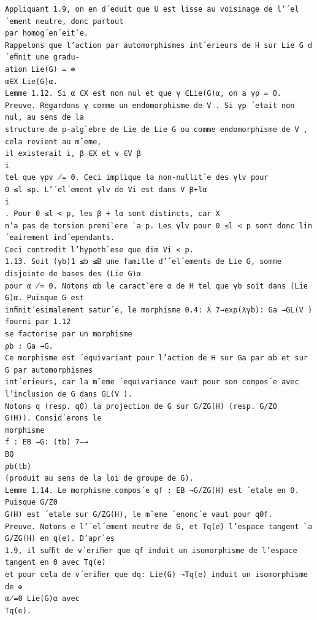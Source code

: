 \documentclass[10pt]{article}
\begin{document}
\begin{verbatim}
Appliquant 1.9, on en d´eduit que U est lisse au voisinage de l’´el´ement neutre, donc partout
par homog´en´eit´e.
Rappelons que l’action par automorphismes int´erieurs de H sur Lie G d´eﬁnit une gradu-
ation Lie(G) = ⊕
α∈X Lie(G)α.
Lemme 1.12. Si α ∈X est non nul et que γ ∈Lie(G)α, on a γp = 0.
Preuve. Regardons γ comme un endomorphisme de V . Si γp ´etait non nul, au sens de la
structure de p-alg`ebre de Lie de Lie G ou comme endomorphisme de V , cela revient au mˆeme,
il existerait i, β ∈X et v ∈V β
i
tel que γpv ̸= 0. Ceci implique la non-nullit´e des γlv pour
0 ≤l ≤p. L’´el´ement γlv de Vi est dans V β+lα
i
. Pour 0 ≤l < p, les β + lα sont distincts, car X
n’a pas de torsion premi`ere `a p. Les γlv pour 0 ≤l < p sont donc lin´eairement ind´ependants.
Ceci contredit l’hypoth`ese que dim Vi < p.
1.13. Soit (γb)1 ≤b ≤B une famille d’´el´ements de Lie G, somme disjointe de bases des (Lie G)α
pour α ̸= 0. Notons αb le caract`ere α de H tel que γb soit dans (Lie G)α. Puisque G est
inﬁnit´esimalement satur´e, le morphisme 0.4: λ 7→exp(λγb): Ga →GL(V ) fourni par 1.12
se factorise par un morphisme
ρb : Ga →G.
Ce morphisme est ´equivariant pour l’action de H sur Ga par αb et sur G par automorphismes
int´erieurs, car la mˆeme ´equivariance vaut pour son compos´e avec l’inclusion de G dans GL(V ).
Notons q (resp. q0) la projection de G sur G/ZG(H) (resp. G/Z0
G(H)). Consid´erons le
morphisme
f : EB →G: (tb) 7−→
BQ
ρb(tb)
(produit au sens de la loi de groupe de G).
Lemme 1.14. Le morphisme compos´e qf : EB →G/ZG(H) est ´etale en 0.
Puisque G/Z0
G(H) est ´etale sur G/ZG(H), le mˆeme ´enonc´e vaut pour q0f.
Preuve. Notons e l’´el´ement neutre de G, et Tq(e) l’espace tangent `a G/ZG(H) en q(e). D’apr`es
1.9, il suﬃt de v´eriﬁer que qf induit un isomorphisme de l’espace tangent en 0 avec Tq(e)
et pour cela de v´eriﬁer que dq: Lie(G) →Tq(e) induit un isomorphisme de ⊕
α̸=0 Lie(G)α avec
Tq(e).


\end{verbatim}
\end{document}

